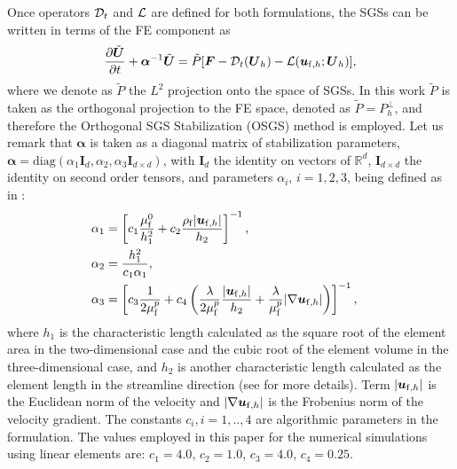 \documentclass[11pt,english]{article}
\def\ufluidh{\boldsymbol{u}_{{\rm{f}},h}}
\def\viscp{\mu^{p}_{\rm{f}}}
\begin{document}
Once operators ${\cal D}_{t}$ and ${\cal L}$ are defined for both
formulations, the SGSs can be written in terms of the FE component as 
\begin{equation*}
    \frac{\partial\tilde{\boldsymbol{U}}}{\partial t}+\boldsymbol{\alpha}^{-1}\tilde{\boldsymbol{U}}=\tilde{P}[\boldsymbol{F}-\mathcal{D}_{t}(\boldsymbol{U}_{h})-\mathcal{L}(\ufluidh;\boldsymbol{U}_{h})],\label{eq: Utilde}
\end{equation*}
where we denote as $\tilde{P}$ the $L^{2}$ projection onto the space of SGSs. 
In this work $\tilde{P}$ is taken as the orthogonal projection to the FE space, denoted as $\tilde{P} = P_h^\bot$, and therefore the Orthogonal SGS Stabilization (OSGS) method \cite{codina2001stabilized} is employed.
Let us remark that $\boldsymbol{\alpha}$ is taken as a diagonal matrix of stabilization parameters,  $\boldsymbol{\alpha}=\text{diag}\left(\alpha_{1}\boldsymbol{I}_{d},\alpha_{2},\alpha_{3}\boldsymbol{I}_{d\times d}\right)$, with $\boldsymbol{I}_{d}$ the identity on vectors of $\mathbb{R}^{d}$, $\boldsymbol{I}_{d\times d}$ the identity on second order tensors, and parameters $\alpha_{i},\,i=1,2,3$, being defined as in \cite{castillo2014}:
\begin{align*}
    \alpha_{1} & =\left[c_{1}\dfrac{\mu_{\rm{f}}^{0}}{h_{1}^{2}}+c_{2}\dfrac{\rho_{\rm{f}}|\ufluidh |}{h_{2}}\right]^{-1}, & \\ %
    \alpha_{2} & =\dfrac{h_{1}^{2}}{c_{1}\alpha_{1}},\\ %
    \alpha_{3} & =\left[c_{3}\dfrac{1}{2\viscp}+c_{4}\left(\dfrac{\lambda}{2\viscp}\dfrac{|\ufluidh|}{h_{2}}+\dfrac{\lambda}{\viscp}|\nabla\ufluidh|\right)\right]^{-1},%
\end{align*}
where $h_{1}$ is the characteristic length calculated as the square root of the element area in the two-dimensional case and the cubic root of the element volume in the three-dimensional case, and $h_{2}$ is another characteristic length calculated as the element length in the streamline direction (see \cite{codina1992intrinsic} for more details). Term $\left|\ufluidh\right|$ is the Euclidean norm of the velocity and $\left|\nabla\ufluidh\right|$ is the Frobenius norm of the velocity gradient. The constants $c_i, i=1,..,4$ are algorithmic parameters in the formulation. The values employed in this paper for the numerical simulations using linear elements are: $c_1=4.0$, $c_2=1.0$, $c_3=4.0$, $c_4=0.25$.
\end{document}
